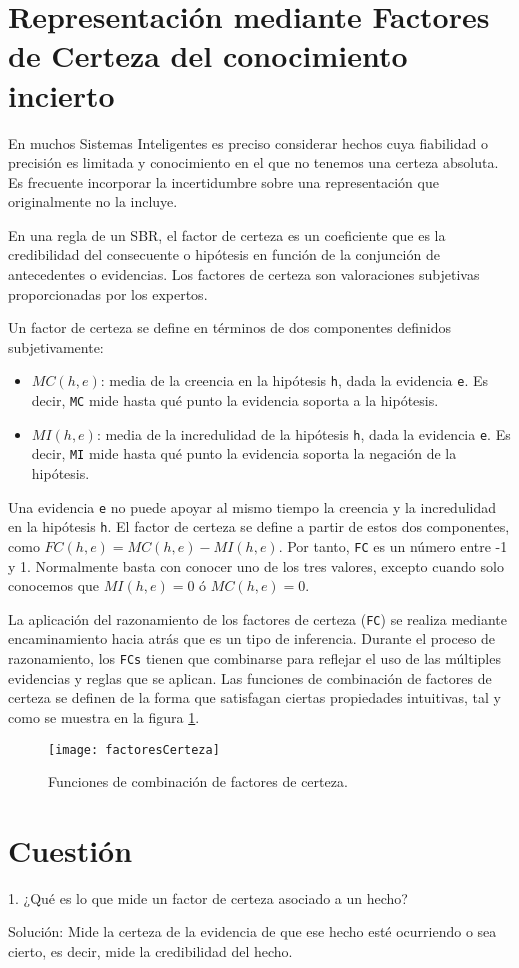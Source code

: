\section{Representación mediante Factores de Certeza del conocimiento incierto}
	\par En muchos Sistemas Inteligentes es preciso considerar hechos cuya fiabilidad o precisión es limitada y
conocimiento en el que no tenemos una certeza absoluta. Es frecuente incorporar la incertidumbre sobre una
representación que originalmente no la incluye. 
	\par En una regla de un SBR, el factor de certeza es un coeficiente que es la credibilidad del consecuente o hipótesis en función de la 
	conjunción de antecedentes o evidencias. Los factores de certeza son valoraciones subjetivas proporcionadas por los expertos.
	\par Un factor de certeza se define en términos de dos componentes definidos subjetivamente:
	\begin{itemize}
		\item $MC(h,e)$: media de la creencia en la hipótesis \texttt{h}, dada la evidencia \texttt{e}. Es decir,
	\texttt{MC} mide hasta qué punto la evidencia soporta a la hipótesis.
		\item $MI(h,e)$: media de la incredulidad de la hipótesis \texttt{h}, dada la evidencia \texttt{e}. Es decir,
	\texttt{MI} mide hasta qué punto la evidencia soporta la negación de la hipótesis.
	\end{itemize}
	\par Una evidencia \texttt{e} no puede apoyar al mismo tiempo la creencia y la incredulidad en la hipótesis \texttt{h}. El factor de certeza 
	se define a partir de estos dos componentes, como $FC(h,e)=MC(h,e)-MI(h,e)$. Por tanto, \texttt{FC} 
	es un número entre -1 y 1. Normalmente basta con conocer uno de los tres valores, excepto cuando solo conocemos que $MI(h,e)=0$ ó $MC(h,e)=0$.
	\par \par La aplicación del razonamiento de los factores de certeza (\texttt{FC}) se realiza mediante encaminamiento hacia atrás que es un tipo de inferencia. Durante el 
	proceso de razonamiento, los \texttt{FCs} tienen que combinarse para reflejar el uso de las múltiples evidencias y reglas que se aplican. Las funciones de combinación de 
	factores de certeza se definen de la forma que satisfagan ciertas propiedades intuitivas, tal y como se muestra en la figura \ref{fig:factorCerteza}.
	 \begin{figure}[H]
		\texttt{[image: factoresCerteza]}
		\centering
		\caption{Funciones de combinación de factores de certeza.}
			\label{fig:factorCerteza}
	\end{figure}
	\section{Cuestión}
\begin{ejer}
	1. ¿Qué es lo que mide un factor de certeza asociado a un hecho?
\end{ejer}
\par Solución: Mide la certeza de la evidencia de que ese hecho esté ocurriendo o sea cierto, es decir, mide la credibilidad del hecho.

\newpage
{}